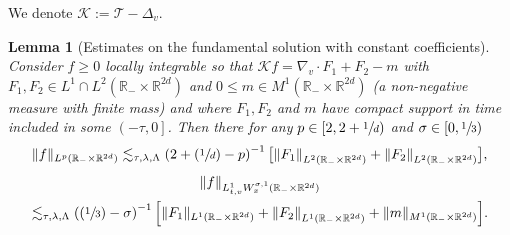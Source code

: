 \documentclass[10pt]{amsart}
\let\mathcal\mathscr
\newcommand{\Psfrac}[2]{(\sfrac{#1}{#2})}
\newtheorem{lemma}[theorem]{Lemma}
\theoremstyle{definition}
\theoremstyle{remark}
\newcommand\R{{\mathbb R}}
\newcommand{\cK}{\mathcal K}
\newcommand{\cT}{\mathcal T}
\begin{document}
We denote $\cK := \cT - \Delta_v$.
\begin{lemma}[Estimates on the fundamental solution with constant
coefficients]
\label{lem:Kolmogorov}
Consider $f \ge 0$ locally integrable so that
$\cK f = \nabla_v \cdot F_1 + F_2 - m$ with
$F_1,F_2 \in L^1 \cap L^2(\R_- \times \R^{2d})$ and
$0 \le m \in M^1(\R_- \times \R^{2d})$ (a non-negative measure
with finite mass) and where $F_1, F_2$ and $m$ have compact
support in time included in some $\left(-\tau,0\right]$. Then
there for any $p \in [2,2+\sfrac1d)$ and
$\sigma \in [0,\sfrac13)$
\begin{equation}
\label{eq:Kolm1}
\| f\|_{L^{p}(\R_- \times \R^{2d})}\lesssim_{\tau,\lambda,\Lambda}
\left(2+\Psfrac1d-p\right)^{-1}
\bigl[ \left\| F_1 \right\|_{L^2(\R_- \times \R^{2d})} +
\left\| F_2 \right\|_{L^2(\R_- \times \R^{2d})} \bigr],
\end{equation}
\begin{multline}\label{eq:Kolm2}
\| f\|_{L^1_{t,v} W^{\sigma,1}_x(\R_- \times \R^{2d})} \\
\lesssim_{\tau,\lambda,\Lambda}
\left(\Psfrac13-\sigma \right)^{-1} \Bigl[ \|
F_1 \|_{L^1(\R_- \times \R^{2d})} + \left\| F_2
\right\|_{L^1(\R_- \times \R^{2d})} + \| m \|_{M^1(\R_- \times
\R^{2d})} \Bigr].
\end{multline}
\end{lemma}
\end{document}
